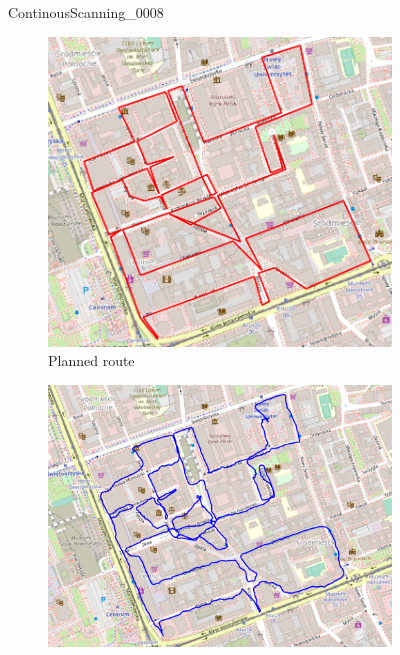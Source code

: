 \documentclass[a4paper,12pt]{book}
\begin{document}
\begin{enumerate}
\begin{figure}[H]
		\caption{ContinousScanning\_0008}
	\end{figure}
	\begin{figure}[H]
		\centering
		\begin{subfigure}{.83\textwidth}
			\centering
			\includegraphics[width=1\linewidth]{route_p8}
			\caption{Planned route}
			\label{fig:a8}
		\end{subfigure}%
		\linebreak
		\begin{subfigure}{.83\textwidth}
			\centering
			\includegraphics[width=1\linewidth]{route_c8}

\end{subfigure}
\end{figure}
\end{enumerate}
\end{document}

